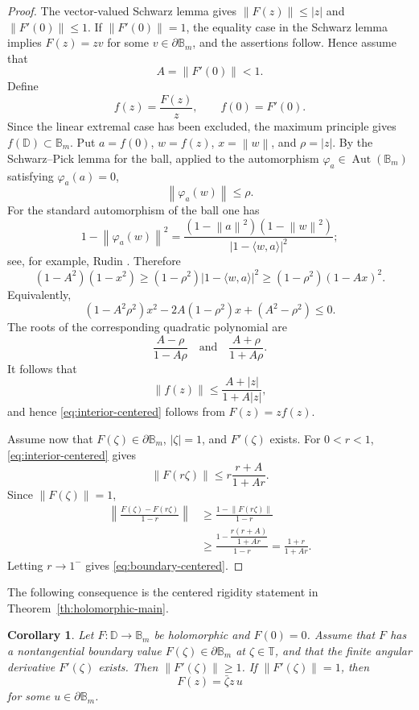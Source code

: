 \documentclass[11pt]{amsart}
\newtheorem{corollary}[theorem]{Corollary}
\theoremstyle{definition}
\theoremstyle{remark}
\newcommand{\D}{\mathbb D}
\newcommand{\T}{\mathbb T}
\newcommand{\B}{\mathbb B}
\newcommand{\inner}[2]{\langle #1,#2\rangle}
\newcommand{\norm}[1]{\left\|#1\right\|}
\newcommand{\Aut}{\operatorname{Aut}}
\begin{document}
\begin{proof}
The vector-valued Schwarz lemma gives \(\norm{F(z)}\le |z|\) and \(\norm{F'(0)}\le1\). If \(\norm{F'(0)}=1\), the equality case in the Schwarz lemma implies \(F(z)=zv\) for some \(v\in\partial\B_m\), and the assertions follow. Hence assume that
\[
        A=\norm{F'(0)}<1.
\]
Define
\[
        f(z)=\frac{F(z)}{z},\qquad f(0)=F'(0).
\]
Since the linear extremal case has been excluded, the maximum principle gives \(f(\D)\subset\B_m\). Put \(a=f(0)\), \(w=f(z)\), \(x=\norm{w}\), and \(\rho=|z|\). By the Schwarz--Pick lemma for the ball, applied to the automorphism \(\varphi_a\in\Aut(\B_m)\) satisfying \(\varphi_a(a)=0\),
\[
        \norm{\varphi_a(w)}\le \rho.
\]
For the standard automorphism of the ball one has
\begin{equation}\label{eq:ball-identity}
        1-\norm{\varphi_a(w)}^2
        =
        \frac{(1-\norm{a}^2)(1-\norm{w}^2)}{|1-\inner{w}{a}|^2};
\end{equation}
see, for example, Rudin \cite[Ch.~2, Sec.~2.2]{Rudin2008}. Therefore
\[
        (1-A^2)(1-x^2)
        \ge
        (1-\rho^2)|1-\inner{w}{a}|^2
        \ge
        (1-\rho^2)(1-Ax)^2.
\]
Equivalently,
\[
        (1-A^2\rho^2)x^2-2A(1-\rho^2)x+(A^2-\rho^2)\le0.
\]
The roots of the corresponding quadratic polynomial are
\[
        \frac{A-\rho}{1-A\rho}
        \quad\text{and}\quad
        \frac{A+\rho}{1+A\rho}.
\]
It follows that
\[
        \norm{f(z)}\le \frac{A+|z|}{1+A|z|},
\]
and hence \eqref{eq:interior-centered} follows from \(F(z)=zf(z)\).

Assume now that \(F(\zeta)\in\partial\B_m\), \(|\zeta|=1\), and \(F'(\zeta)\) exists. For \(0<r<1\), \eqref{eq:interior-centered} gives
\[
        \norm{F(r\zeta)}
        \le
        r\frac{r+A}{1+Ar}.
\]
Since \(\norm{F(\zeta)}=1\),
\[
\begin{aligned}
        \left\|\frac{F(\zeta)-F(r\zeta)}{1-r}\right\|
        &\ge
        \frac{1-\norm{F(r\zeta)}}{1-r}  \\
        &\ge
        \frac{1-\dfrac{r(r+A)}{1+Ar}}{1-r}
        =
        \frac{1+r}{1+Ar}.
\end{aligned}
\]
Letting \(r\to1^-\) gives \eqref{eq:boundary-centered}.
\end{proof}

The following consequence is the centered rigidity statement in Theorem~\ref{th:holomorphic-main}.

\begin{corollary}\label{cor:centered-affine}
Let \(F:\D\to\B_m\) be holomorphic and \(F(0)=0\). Assume that \(F\) has a nontangential boundary value \(F(\zeta)\in\partial\B_m\) at \(\zeta\in\T\), and that the finite angular derivative \(F'(\zeta)\) exists. Then \(\norm{F'(\zeta)}\ge1\). If \(\norm{F'(\zeta)}=1\), then
\[
        F(z)=\bar\zeta z\,u
\]
for some \(u\in\partial\B_m\).
\end{corollary}
\end{document}
